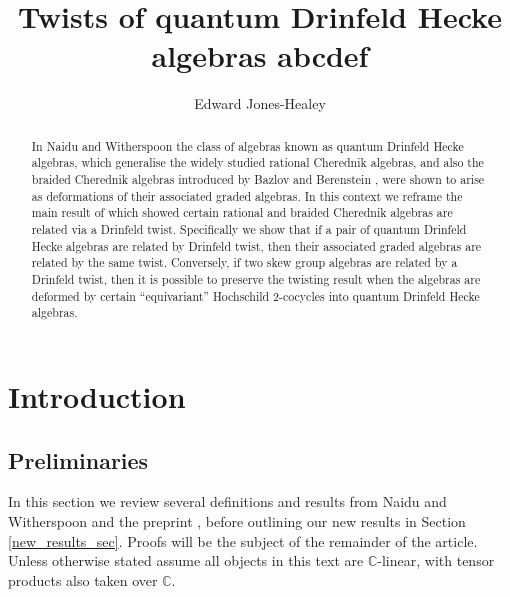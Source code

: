 \documentclass[10pt]{article}
\title{Twists of quantum Drinfeld Hecke algebras abcdef}
\author{Edward Jones-Healey}
\date{}
\newcommand{\bb}{\medbreak}
\newcommand{\Cc }{\mathbb{C}}
\theoremstyle{definition}
\begin{document}
\maketitle

\begin{abstract} In Naidu and Witherspoon \cite{2011arXiv11115243N} the class of algebras known as quantum Drinfeld Hecke algebras, which generalise the widely studied rational Cherednik algebras, and also the braided Cherednik algebras introduced by Bazlov and Berenstein \cite{bazlov2009noncommutative}, were shown to arise as deformations of their associated graded algebras. In this context we reframe the main result of \cite{twistsrcas} which showed certain rational and braided Cherednik algebras are related via a Drinfeld twist. Specifically we show that if a pair of quantum Drinfeld Hecke algebras are related by Drinfeld twist, then their associated graded algebras are related by the same twist. Conversely, if two skew group algebras are related by a Drinfeld twist, then it is possible to preserve the twisting result when the algebras are deformed by certain ``equivariant'' Hochschild $2$-cocycles into quantum Drinfeld Hecke algebras.
  
\end{abstract}

\tableofcontents

%

%

\section{Introduction}
\subsection{Preliminaries}
In this section we review several definitions and results from Naidu and Witherspoon \cite{2011arXiv11115243N} and the preprint \cite{twistsrcas}, before outlining our new results in Section \ref{new_results_sec}. Proofs will be the subject of the remainder of the article. Unless otherwise stated assume all objects in this text are $\Cc $-linear, with tensor products also taken over $\Cc $.\bb
\end{document}
